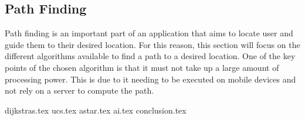\subsection{Path Finding}
Path finding is an important part of an application that aims to locate user and guide them to their desired location. For this reason, this section will focus on the different algorithms available to find a path to a desired location. One of the key points of the chosen algorithm is that it must not take up a large amount of processing power. This is due to it needing to be executed on mobile devices and not rely on a server to compute the path.

{dijkstras.tex}
{ucs.tex}
{astar.tex}
{ai.tex}
{conclusion.tex}